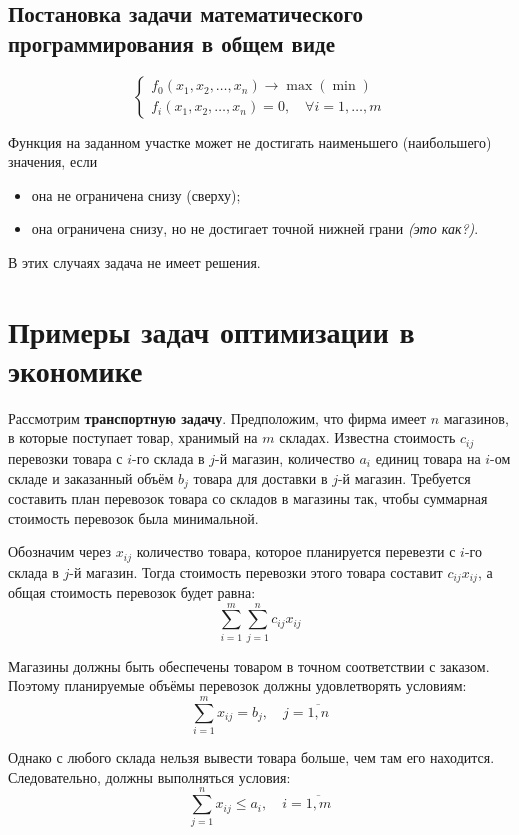\documentclass[17pt]{extarticle}
\begin{document}
\subsection{Постановка задачи математического программирования в общем виде}
\[
    \begin{cases}
        f_0(x_1, x_2, \dots, x_n) \to \max(\min) \\
        f_i(x_1, x_2, \dots, x_n) = 0, \quad \forall i = 1, \dots, m
    \end{cases}
\]

Функция на заданном участке может не достигать наименьшего (наибольшего) значения, если
\begin{itemize}
    \item она не ограничена снизу (сверху);
    \item она ограничена снизу, но не достигает точной нижней грани \textit{(это как?)}.
\end{itemize}

В этих случаях задача не имеет решения.




\section{Примеры задач оптимизации в экономике}

Рассмотрим \textbf{транспортную задачу}. Предположим, что фирма имеет \( n \) магазинов, в которые поступает товар, хранимый на \( m \) складах. Известна стоимость \( c_{ij} \) перевозки товара с \( i \)-го склада в \( j \)-й магазин, количество \( a_i \) единиц товара на \( i \)-ом складе и заказанный объём \( b_j \) товара для доставки в \( j \)-й магазин. Требуется составить план перевозок товара со складов в магазины так, чтобы суммарная стоимость перевозок была минимальной.

Обозначим через \( x_{ij} \) количество товара, которое планируется перевезти с \( i \)-го склада в \( j \)-й магазин. Тогда стоимость перевозки этого товара составит \( c_{ij}x_{ij} \), а общая стоимость перевозок будет равна:
\[
    \sum_{i=1}^m \sum_{j=1}^n c_{ij}x_{ij}
\]

Магазины должны быть обеспечены товаром в точном соответствии с заказом. Поэтому планируемые объёмы перевозок должны удовлетворять условиям:
\[
    \sum_{i=1}^m x_{ij} = b_j, \quad j = \overline{1,n}
\]

Однако с любого склада нельзя вывести товара больше, чем там его находится. Следовательно, должны выполняться условия:
\[
    \sum_{j=1}^n x_{ij} \le a_i, \quad i = \overline{1,m}
\]
\end{document}
